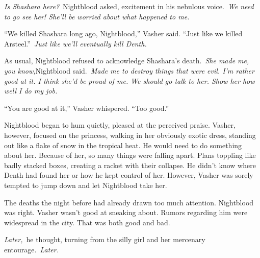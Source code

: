 \textit{Is Shashara here?}~Nightblood asked, excitement in his nebulous voice.~\textit{We need to go see her! She’ll be worried about what happened to me.}

“We killed Shashara long ago, Nightblood,” Vasher said. “Just like we killed Arsteel.”~\textit{Just like we’ll eventually kill Denth.}

As usual, Nightblood refused to acknowledge Shashara’s death.~\textit{She made me, you know,}Nightblood said.~\textit{Made me to destroy things that were evil. I’m rather good at it. I think she’d be proud of me. We should go talk to her. Show her how well I do my job.}

“You are good at it,” Vasher whispered. “Too good.”

Nightblood began to hum quietly, pleased at the perceived praise. Vasher, however, focused on the princess, walking in her obviously exotic dress, standing out like a flake of snow in the tropical heat. He would need to do something about her. Because of her, so many things were falling apart. Plans toppling like badly stacked boxes, creating a racket with their collapse. He didn’t know where Denth had found her or how he kept control of her. However, Vasher was sorely tempted to jump down and let Nightblood take her.

The deaths the night before had already drawn too much attention. Nightblood was right. Vasher wasn’t good at sneaking about. Rumors regarding him were widespread in the city. That was both good and bad.

\textit{Later,}~he thought, turning from the silly girl and her mercenary entourage.~\textit{Later.}

